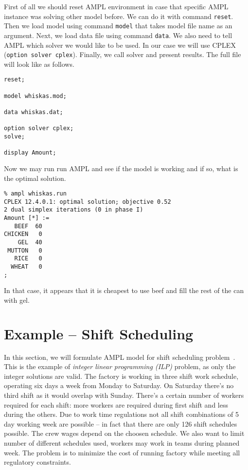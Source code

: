 First of all we should reset AMPL environment in case that specific AMPL instance was solving other model before. We can do it with command \texttt{reset}. Then we load model using command \texttt{model} that takes model file name as an argument. Next, we load data file using command \texttt{data}. We also need to tell AMPL which solver we would like to be used. In our case we will use CPLEX (\texttt{option solver cplex}). Finally, we call solver and present results. The full file will look like as follows.

\begin{lstlisting}
reset;

model whiskas.mod;

data whiskas.dat;

option solver cplex;
solve;

display Amount;
\end{lstlisting}

Now we may run run AMPL and see if the model is working and if so, what is the optimal solution.

\begin{lstlisting}
% ampl whiskas.run
CPLEX 12.4.0.1: optimal solution; objective 0.52
2 dual simplex iterations (0 in phase I)
Amount [*] :=
   BEEF  60
CHICKEN   0
    GEL  40
 MUTTON   0
   RICE   0
  WHEAT   0
;
\end{lstlisting}

In that case, it appears that it is cheapest to use beef and fill the rest of the can with gel.

\section{Example -- Shift Scheduling}
\label{sec:ampl:sched}

In this section, we will formulate AMPL model for shift scheduling problem~\cite{Fourer2002}. This is the example of \emph{integer linear programming (ILP)} problem, as only the integer solutions are valid. The factory is working in three shift work schedule, operating six days a week from Monday to Saturday. On Saturday there's no third shift as it would overlap with Sunday. There's a certain number of workers required for each shift: more workers are required during first shift and less during the others. Due to work time regulations not all shift combinations of 5 day working week are possible -- in fact that there are only 126 shift schedules possible. The crew wages depend on the choosen schedule. We also want to limit number of different schedules used, workers may work in teams during planned week. The problem is to minimize the cost of running factory while meeting all regulatory constraints.


